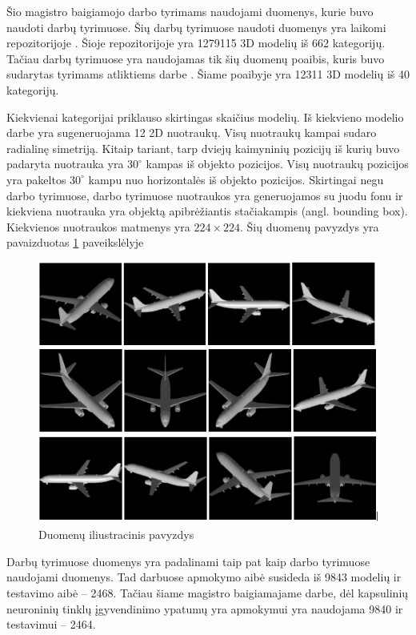 Šio magistro baigiamojo darbo tyrimams naudojami duomenys, kurie buvo naudoti darbų \cite{cnnExp1, cnnExp2} tyrimuose. Šių darbų tyrimuose naudoti duomenys yra laikomi repozitorijoje \cite{dataRepo}. Šioje repozitorijoje yra 1279115 3D modelių iš 662 kategorijų. Tačiau darbų \cite{cnnExp1, cnnExp2} tyrimuose yra naudojamas tik šių duomenų poaibis, kuris buvo sudarytas tyrimams atliktiems darbe \cite{dbnExp}. Šiame poaibyje yra 12311 3D modelių iš 40 kategorijų.

Kiekvienai kategorijai priklauso skirtingas skaičius modelių. Iš kiekvieno modelio darbe \cite{cnnExp2} yra sugeneruojama 12 2D nuotraukų. Visų nuotraukų kampai sudaro radialinę simetriją. Kitaip tariant, tarp dviejų kaimyninių pozicijų iš kurių buvo padaryta nuotrauka yra $30^{\circ}$ kampas iš objekto pozicijos. Visų nuotraukų pozicijos yra pakeltos $30^{\circ}$ kampu nuo horizontalės iš objekto pozicijos. Skirtingai negu darbo \cite{dbnExp} tyrimuose, darbo \cite{cnnExp2} tyrimuose nuotraukos yra generuojamos su juodu fonu ir kiekviena nuotrauka yra objektą apibrėžiantis stačiakampis (angl. bounding box). Kiekvienos nuotraukos matmenys yra $224\times224$. Šių duomenų pavyzdys yra pavaizduotas \ref{img:data_example} paveikslėlyje


\begin{figure}[H]
	\centering
	\includegraphics[scale=0.5]{img/data_example.png}
	\caption{Duomenų iliustracinis pavyzdys}
	\label{img:data_example}
\end{figure}

Darbų \cite{cnnExp1, cnnExp2} tyrimuose duomenys yra padalinami taip pat kaip darbo \cite{dbnExp} tyrimuose naudojami duomenys. Tad darbuose \cite{cnnExp1, cnnExp2, dbnExp} apmokymo aibė susideda iš 9843 modelių ir testavimo aibė -- 2468. Tačiau šiame magistro baigiamajame darbe, dėl kapsulinių neuroninių tinklų įgyvendinimo ypatumų yra apmokymui yra naudojama 9840 ir testavimui -- 2464.
